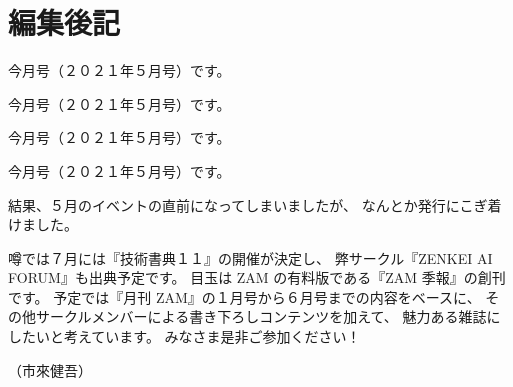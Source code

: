 \documentclass[dvipdfmx,autodetect-engine,10pt,b5paper,papersize,openany,dvipsnames]{jsbook}
\renewcommand{\headrulewidth}{0pt} %
\begin{document}
\chapter*{編集後記}

\pagestyle{fancy}
\fancyhf{} %
\renewcommand{\headrulewidth}{0pt} %
\fancyfoot[RE]{\leftmark}
\fancyfoot[LE,RO]{\thepage}

\thispagestyle{fancy}

今月号（２０２１年５月号）です。

今月号（２０２１年５月号）です。

今月号（２０２１年５月号）です。

今月号（２０２１年５月号）です。

結果、５月のイベントの直前になってしまいましたが、
なんとか発行にこぎ着けました。

\vspace{1em}

噂では７月には『技術書典１１』の開催が決定し、
弊サークル『ZENKEI AI FORUM』も出典予定です。
目玉は ZAM の有料版である『ZAM 季報』の創刊です。
予定では『月刊 ZAM』の１月号から６月号までの内容をベースに、
その他サークルメンバーによる書き下ろしコンテンツを加えて、
魅力ある雑誌にしたいと考えています。
みなさま是非ご参加ください！

\begin{flushright}
  （市來健吾）
\end{flushright}
\end{document}
